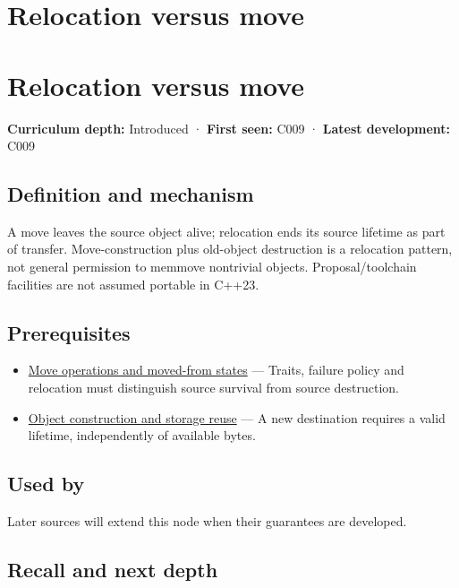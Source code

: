 \hypertarget{appendix-adfd6397af8d}{}
\section*{Relocation versus move}
\section{Relocation versus move}\label{relocation-versus-move}

\textbf{Curriculum depth:} Introduced · \textbf{First seen:} C009 · \textbf{Latest development:} C009

\subsection{Definition and mechanism}\label{definition-and-mechanism}

A move leaves the source object alive; relocation ends its source lifetime as part of transfer. Move-construction plus old-object destruction is a relocation pattern, not general permission to memmove nontrivial objects. Proposal/toolchain facilities are not assumed portable in C++23.

\subsection{Prerequisites}\label{prerequisites}

\begin{itemize}
\tightlist
\item
  \hyperref[appendix-5636651017c2]{Move operations and moved-from states} --- Traits, failure policy and relocation must distinguish source survival from source destruction.
\item
  \hyperref[appendix-a82f9c438857]{Object construction and storage reuse} --- A new destination requires a valid lifetime, independently of available bytes.
\end{itemize}

\subsection{Used by}\label{used-by}

Later sources will extend this node when their guarantees are developed.

\subsection{Recall and next depth}\label{recall-and-next-depth}

